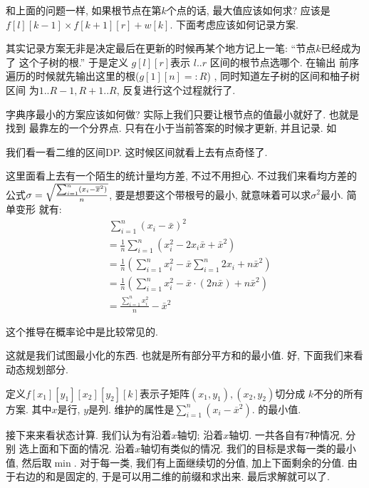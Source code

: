 和上面的问题一样, 如果根节点在第$k$个点的话, 最大值应该如何求? 应该是
$f[l][k-1]\times f[k+1][r]+w[k]$. 下面考虑应该如何记录方案. 

其实记录方案无非是决定最后在更新的时候再某个地方记上一笔: ``节点$k$已经成为了
这个子树的根.'' 于是定义 $g[l][r]$表示 $l..r$ 区间的根节点选哪个. 在输出
前序遍历的时候就先输出这里的根($g[1][n]=:R$)
, 同时知道左子树的区间和柚子树区间
为$1..R-1, R+1..R$, 反复进行这个过程就行了. 

字典序最小的方案应该如何做? 实际上我们只要让根节点的值最小就好了. 也就是找到
最靠左的一个分界点. 只有在小于当前答案的时候才更新, 并且记录. 如

我们看一看二维的区间DP. 这时候区间就看上去有点奇怪了. 

 这里面看上去有一个陌生的统计量均方差, 不过不用担心. 
不过我们来看均方差的公式$\sigma = \sqrt{\sum_{i=1}^n(x_i-\overline{x}^2)
\over n}$, 要是想要这个带根号的最小, 就意味着可以求$\sigma^2$最小. 简单变形
就有: 
$$
    \begin{aligned}
        &~{\sum_{i=1}^{n} (x_i-\bar x)^2} \\
        &= \frac1n\sum_{i=1}^{n} (x_i^2-2x_i\bar x+\bar x^2) \\
        &= \frac1n \left(\sum_{i=1}^{n} x_i^2 - \bar x \sum_{i=1}^{n}2x_i + n\bar x^2\right)\\
        &= \frac1n \left(\sum_{i=1}^{n} x_i^2 - \bar x \cdot (2n\bar x) + n\bar x^2\right)\\
        &= \frac{\sum_{i=1}^n x_i^2}{n} - \bar x^2
    \end{aligned}
$$

\begin{remark}
    这个推导在概率论中是比较常见的. 
\end{remark}

这就是我们试图最小化的东西. 也就是所有部分平方和的最小值. 好, 下面我们来看动态规划部分.

定义$f[x_1][y_1][x_2][y_2][k]$表示子矩阵$(x_1, y_1), (x_2, y_2)$切分成
$k$不分的所有方案. 其中$x$是行, $y$是列. 维护的属性是$\sum_{i=1}^n(x_i-\overline{x}^2)$.
的最小值. 

接下来来看状态计算. 我们认为有沿着$x$轴切; 沿着$x$轴切. 一共各自有7种情况, 分别
选上面和下面的情况. 沿着$x$轴切有类似的情况. 
我们的目标是求每一类的最小值, 然后取$\min$. 对于每一类, 我们有上面继续切的分值, 
加上下面剩余的分值. 由于右边的和是固定的, 于是可以用二维的前缀和求出来. 最后求解就可以了. 

